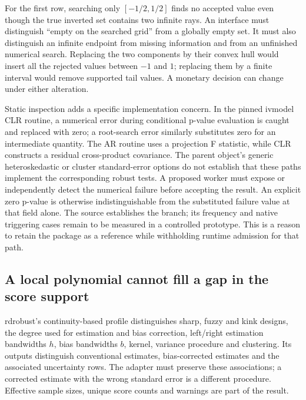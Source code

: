 For the first row, searching only $[-1/2,1/2]$ finds no accepted value even
though the true inverted set contains two infinite rays. An interface must
distinguish ``empty on the searched grid'' from a globally empty set. It must
also distinguish an infinite endpoint from missing information and from an
unfinished numerical search. Replacing the two components by their convex hull
would insert all the rejected values between $-1$ and $1$; replacing them by a
finite interval would remove supported tail values. A monetary decision can
change under either alteration.

Static inspection adds a specific implementation concern. In the pinned
ivmodel CLR routine, a numerical error during conditional p-value evaluation is
caught and replaced with zero; a root-search error similarly substitutes zero
for an intermediate quantity. The AR routine uses a projection F statistic,
while CLR constructs a residual cross-product covariance. The parent object's
generic heteroskedastic or cluster standard-error options do not establish that
these paths implement the corresponding robust tests.\citep{exec22_riv_ivmodel}
A proposed worker must expose or independently detect the numerical failure
before accepting the result. An explicit zero p-value is otherwise
indistinguishable from the substituted failure value at that field alone. The
source establishes the branch; its frequency and native triggering cases remain
to be measured in a controlled prototype. This is a reason to retain the
package as a reference while withholding runtime admission for that path.

\subsection{A local polynomial cannot fill a gap in the score support}
\label{exec22:riv-continuity}

rdrobust's continuity-based profile distinguishes sharp, fuzzy and kink designs,
the degree used for estimation and bias correction, left/right estimation
bandwidths $h$, bias bandwidths $b$, kernel, variance procedure and clustering.
Its outputs distinguish conventional estimates, bias-corrected estimates and
the associated uncertainty rows. The adapter must preserve these associations;
a corrected estimate with the wrong standard error is a different procedure.
Effective sample sizes, unique score counts and warnings are part of the result.
\citep{exec22_riv_rdrobust}

